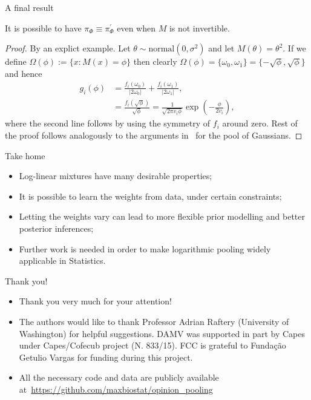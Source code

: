 \begin{frame}{A final result}
\begin{remark}
 \label{rmk:invertibleIFF}
 It is possible to have  $\pi_\Phi \equiv \pi_\Phi^{\prime}$ even when $M$ is not invertible.
\end{remark}
\begin{proof}
 By an explict example. 
 Let $\theta \sim \text{normal}(0, \sigma^2)$ and let $M(\theta) = \theta^2$.
 If we define $\Omega(\phi) := \{ x: M(x) = \phi \}$ then clearly $\Omega(\phi) = \{ \omega_0, \omega_1 \} = \{ -\sqrt{\phi}, \sqrt{\phi} \}$ and hence
 \begin{align*}
 \label{eq:normalInvert}
 g_i(\phi) &= \frac{f_i(\omega_0)}{|2\omega_0|} + \frac{f_i(\omega_1)}{|2\omega_1|}, \\
        &= \frac{f_i(\sqrt{\phi})}{\sqrt{\phi}} = \frac{1}{\sqrt{2\pi v_i \phi}} \exp\left(-\frac{\phi}{2v_i}\right),
\end{align*}
where the second line follows by using the symmetry of $f_i$ around zero.
Rest of the proof follows analogously to the arguments in~\cite{Carvalho2019} for the pool of Gaussians.
\end{proof}
\end{frame}
\begin{frame}{Take home}
\begin{itemize}[label={$\boldsymbol\tau_h:$}]
 \item Log-linear mixtures have many desirable properties;\pause
 \item It is possible to learn the weights from data, under certain constraints;\pause
 \item Letting the weights vary can lead to more flexible prior modelling and better posterior inferences;\pause
 \item Further work is needed in order to make logarithmic pooling widely applicable in Statistics.
\end{itemize}
\end{frame}
\begin{frame}{Thank you!}
 \begin{itemize}
  \item Thank you very much for your attention!
  \item The authors would like to thank Professor Adrian Raftery (University of Washington) for helpful suggestions.
DAMV was supported in part by Capes under Capes/Cofecub project (N. 833/15).
FCC is grateful to Funda\c{c}\~ao Getulio Vargas for funding during this project.
  \item All the necessary code and data are publicly available at~\url{https://github.com/maxbiostat/opinion_pooling}
 \end{itemize}
\end{frame}
